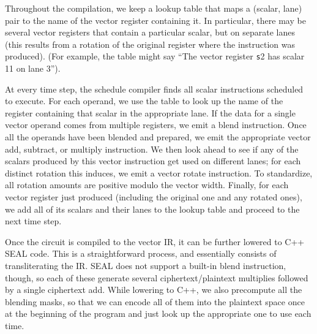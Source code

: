 Throughout the compilation, we keep a lookup table that maps a (scalar, lane) pair to the name of the vector register containing it.
In particular, there may be several vector registers that contain a particular scalar, but on separate lanes (this results from a rotation of the original register where the instruction was produced).
(For example, the table might say ``The vector register {\texttt s2} has scalar 11 on lane 3'').

At every time step, the schedule compiler finds all scalar instructions scheduled to execute.
For each operand, we use the table to look up the name of the register containing that scalar in the appropriate lane.
If the data for a single vector operand comes from multiple registers, we emit a blend instruction.
Once all the operands have been blended and prepared, we emit the appropriate vector add, subtract, or multiply instruction.
We then look ahead to see if any of the scalars produced by this vector instruction get used on different lanes; for each distinct rotation this induces, we emit a vector rotate instruction.
To standardize, all rotation amounts are positive modulo the vector width.
Finally, for each vector register just produced (including the original one and any rotated ones), we add all of its scalars and their lanes to the lookup table and proceed to the next time step.

Once the circuit is compiled to the vector IR, it can be further lowered to C++ SEAL code.
This is a straightforward process, and essentially consists of transliterating the IR. 
SEAL does not support a built-in blend instruction, though, so each of these generate several ciphertext/plaintext multiplies followed by a single ciphertext add.
While lowering to C++, we also precompute all the blending masks, so that we can encode all of them into the plaintext space once at the beginning of the program and just look up the appropriate one to use each time.


